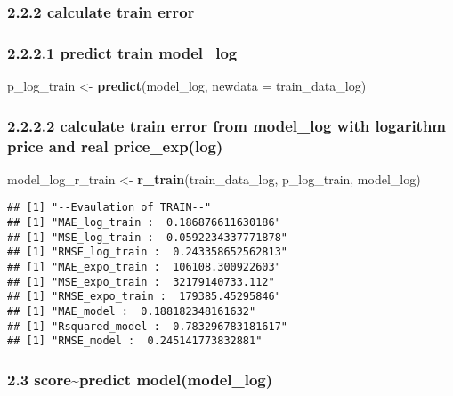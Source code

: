\documentclass[
]{article}
\newenvironment{Shaded}{\begin{snugshade}}{\end{snugshade}}
\newcommand{\AttributeTok}[1]{\textcolor[rgb]{0.13,0.29,0.53}{#1}}
\newcommand{\FunctionTok}[1]{\textcolor[rgb]{0.13,0.29,0.53}{\textbf{#1}}}
\newcommand{\NormalTok}[1]{#1}
\newcommand{\OtherTok}[1]{\textcolor[rgb]{0.56,0.35,0.01}{#1}}
\begin{document}
\hypertarget{calculate-train-error}{%
\subsubsection{2.2.2 calculate train
error}\label{calculate-train-error}}

\hypertarget{predict-train-model_log}{%
\subsubsection{2.2.2.1 predict train
model\_log}\label{predict-train-model_log}}

\begin{Shaded}
\begin{Highlighting}[]
\NormalTok{p\_log\_train }\OtherTok{\textless{}{-}} \FunctionTok{predict}\NormalTok{(model\_log, }\AttributeTok{newdata =}\NormalTok{ train\_data\_log)}
\end{Highlighting}
\end{Shaded}

\hypertarget{calculate-train-error-from-model_log-with-logarithm-price-and-real-price_explog}{%
\subsubsection{2.2.2.2 calculate train error from model\_log with
logarithm price and real
price\_exp(log)}\label{calculate-train-error-from-model_log-with-logarithm-price-and-real-price_explog}}

\begin{Shaded}
\begin{Highlighting}[]
\NormalTok{model\_log\_r\_train }\OtherTok{\textless{}{-}} \FunctionTok{r\_train}\NormalTok{(train\_data\_log, p\_log\_train, model\_log)}
\end{Highlighting}
\end{Shaded}

\begin{verbatim}
## [1] "--Evaulation of TRAIN--"
## [1] "MAE_log_train :  0.186876611630186"
## [1] "MSE_log_train :  0.0592234337771878"
## [1] "RMSE_log_train :  0.243358652562813"
## [1] "MAE_expo_train :  106108.300922603"
## [1] "MSE_expo_train :  32179140733.112"
## [1] "RMSE_expo_train :  179385.45295846"
## [1] "MAE_model :  0.188182348161632"
## [1] "Rsquared_model :  0.783296783181617"
## [1] "RMSE_model :  0.245141773832881"
\end{verbatim}

\hypertarget{scorepredict-modelmodel_log}{%
\subsubsection{2.3 score\textasciitilde predict
model(model\_log)}\label{scorepredict-modelmodel_log}}
\end{document}
